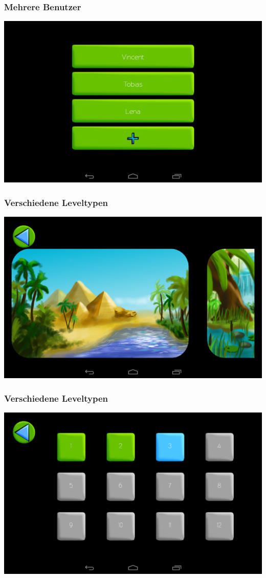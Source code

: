 \documentclass[t]{beamer}
\begin{document}
\begin{frame}
	\frametitle{Mehrere Benutzer}
	\includegraphics[width=\textwidth]{images/screenshots/users}
\end{frame}

\begin{frame}
	\frametitle{Verschiedene Leveltypen}
	\includegraphics[width=\textwidth]{images/screenshots/packages}
\end{frame}

\begin{frame}
	\frametitle{Verschiedene Leveltypen}
	\includegraphics[width=\textwidth]{images/screenshots/levels}
\end{frame}
\end{document}
